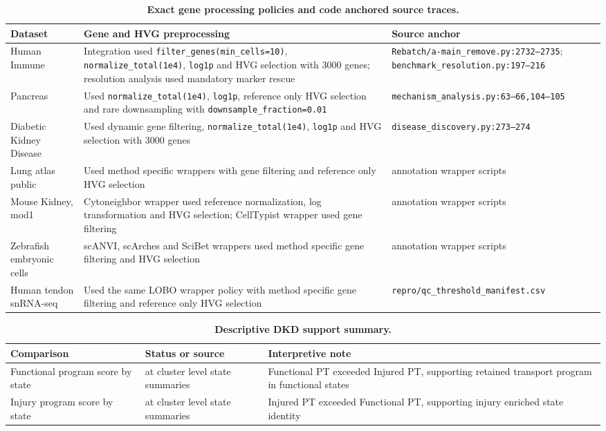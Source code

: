 \documentclass[11pt]{article}
\begin{document}
\FloatBarrier

\begin{table}[htbp]
\centering
\caption{\textbf{Exact gene processing policies and code anchored source traces.}}
\label{tab:s10_preprocessing_anchor}
\scriptsize
\begin{tabularx}{\textwidth}{@{}L{0.22\textwidth} Y L{0.28\textwidth}@{}}
\toprule
\textbf{Dataset} & \textbf{Gene and HVG preprocessing} & \textbf{Source anchor} \\
\midrule
Human Immune & Integration used \texttt{filter\_genes(min\_cells=10)}, \texttt{normalize\_total(1e4)}, \texttt{log1p} and HVG selection with 3000 genes; resolution analysis used mandatory marker rescue & \texttt{Rebatch/a-main\_remove.py:2732--2735}; \texttt{benchmark\_resolution.py:197--216} \\
Pancreas & Used \texttt{normalize\_total(1e4)}, \texttt{log1p}, reference only HVG selection and rare downsampling with \texttt{downsample\_fraction=0.01} & \texttt{mechanism\_analysis.py:63--66,104--105} \\
Diabetic Kidney Disease & Used dynamic gene filtering, \texttt{normalize\_total(1e4)}, \texttt{log1p} and HVG selection with 3000 genes & \texttt{disease\_discovery.py:273--274} \\
Lung atlas public & Used method specific wrappers with gene filtering and reference only HVG selection & annotation wrapper scripts \\
Mouse Kidney, mod1 & Cytoneighbor wrapper used reference normalization, log transformation and HVG selection; CellTypist wrapper used gene filtering & annotation wrapper scripts \\
Zebrafish embryonic cells & scANVI, scArches and SciBet wrappers used method specific gene filtering and HVG selection & annotation wrapper scripts \\
Human tendon snRNA-seq & Used the same LOBO wrapper policy with method specific gene filtering and reference only HVG selection & \texttt{repro/qc\_threshold\_manifest.csv} \\
\bottomrule
\end{tabularx}
\end{table}

\FloatBarrier

\begin{table}[htbp]
\centering
\caption{\textbf{Descriptive DKD support summary.}}
\label{tab:s11_dkd_descriptive}
\scriptsize
\begin{tabularx}{\textwidth}{@{}L{0.24\textwidth} L{0.28\textwidth} Y@{}}
\toprule
\textbf{Comparison} & \textbf{Status or source} & \textbf{Interpretive note} \\
\midrule
Functional program score by state & at cluster level state summaries & Functional PT exceeded Injured PT, supporting retained transport program in functional states \\
Injury program score by state & at cluster level state summaries & Injured PT exceeded Functional PT, supporting injury enriched state identity \\
\bottomrule
\end{tabularx}
\end{table}
\end{document}
